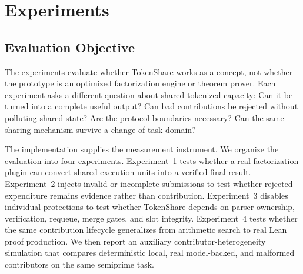 \documentclass{article}
\theoremstyle{plain}
\begin{document}
\section{Experiments}
\label{sec:experiments}

\subsection{Evaluation Objective}
\label{subsec:evaluation-objective}

{\color{blue}
The experiments evaluate whether TokenShare works as a concept, not whether the prototype is an optimized factorization engine or theorem prover. Each experiment asks a different question about shared tokenized capacity: Can it be turned into a complete useful output? Can bad contributions be rejected without polluting shared state? Are the protocol boundaries necessary? Can the same sharing mechanism survive a change of task domain?

The implementation supplies the measurement instrument. We organize the evaluation into four experiments. Experiment~1 tests whether a real factorization plugin can convert shared execution units into a verified final result. Experiment~2 injects invalid or incomplete submissions to test whether rejected expenditure remains evidence rather than contribution. Experiment~3 disables individual protections to test whether TokenShare depends on parser ownership, verification, requeue, merge gates, and slot integrity. Experiment~4 tests whether the same contribution lifecycle generalizes from arithmetic search to real Lean proof production. We then report an auxiliary contributor-heterogeneity simulation that compares deterministic local, real model-backed, and malformed contributors on the same semiprime task.
}
\end{document}
